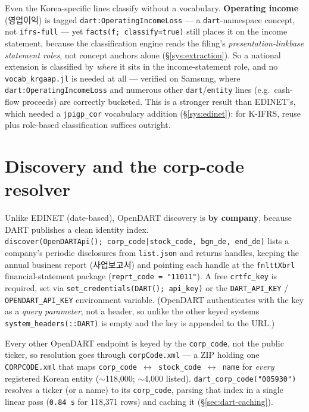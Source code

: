 \documentclass[11pt,a4paper]{report}
\newcommand{\krcjk}[2]{{\cjkKRfont #1}}
\begin{document}
\noindent Even the Korea-specific lines classify without a vocabulary. \textbf{Operating income}
(\krcjk{영업이익}{\emph{yeongeop iik}}) is tagged \texttt{dart:OperatingIncomeLoss} --- a \texttt{dart}-namespace
concept, not \texttt{ifrs-full} --- yet \texttt{facts(f;\ classify=true)} still places it on the income
statement, because the classification engine reads the filing's \emph{presentation-linkbase statement
roles}, not concept anchors alone (\S\ref{sys:extraction}). So a national extension is classified by
\emph{where} it sits in the income-statement role, and no \texttt{vocab\_krgaap.jl} is needed at all ---
verified on Samsung, where \texttt{dart:OperatingIncomeLoss} and numerous other \texttt{dart}/\texttt{entity}
lines (e.g.\ cash-flow proceeds) are correctly bucketed. This is a stronger result than EDINET's, which
needed a \texttt{jpigp\_cor} vocabulary addition (\S\ref{sys:edinet}): for K-IFRS, reuse plus role-based
classification suffices outright.

\section{Discovery and the corp-code resolver}

Unlike EDINET (date-based), OpenDART discovery is \textbf{by company}, because DART publishes a clean
identity index. \texttt{discover(OpenDARTApi();\ corp\_code|stock\_code,\ bgn\_de,\ end\_de)} lists a
company's periodic disclosures from \texttt{list.json} and returns handles, keeping the annual business
report (\krcjk{사업보고서}{\emph{saeop bogoseo}}) and pointing each handle at the \texttt{fnlttXbrl} financial-statement package
(\texttt{reprt\_code\ =\ "11011"}). A free \texttt{crtfc\_key} is required, set via
\texttt{set\_credentials(DART();\ api\_key)} or the \texttt{DART\_API\_KEY} / \texttt{OPENDART\_API\_KEY}
environment variable. (OpenDART authenticates with the key as a \emph{query parameter}, not a header, so
unlike the other keyed systems \texttt{system\_headers(::DART)} is empty and the key is appended to the
URL.)

Every other OpenDART endpoint is keyed by the \texttt{corp\_code}, not the public ticker, so resolution
goes through \texttt{corpCode.xml} --- a ZIP holding one \texttt{CORPCODE.xml} that maps
\texttt{corp\_code\ $\leftrightarrow$\ stock\_code\ $\leftrightarrow$\ name} for \emph{every} registered
Korean entity ($\sim$118{,}000; $\sim$4{,}000 listed). \texttt{dart\_corp\_code("005930")} resolves a
ticker (or a name) to its \texttt{corp\_code}, parsing that index in a single linear pass
(\texttt{0.84\,s} for 118{,}371 rows) and caching it (\S\ref{sec:dart-caching}).
\end{document}
